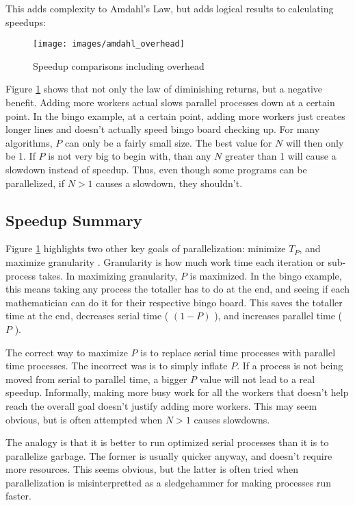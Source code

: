 This adds complexity to Amdahl's Law, but adds logical results to calculating speedups:

\begin{figure}[h]
	\begin{center}
		\texttt{[image: images/amdahl\_overhead]}
		\caption{Speedup comparisons including overhead} 
		\label{amdahl_overhead_graph}
	\end{center}
\end{figure}

Figure \ref{amdahl_overhead_graph} shows that not only the law of diminishing returns, but a negative 
benefit. Adding more workers actual slows parallel processes down at a certain point. In the bingo example,
at a certain point, adding more workers just creates longer lines and doesn't actually speed bingo board 
checking up. For many algorithms, $ P $ can only be a fairly small size. The best value for $ N $ will then only be 1. If $ P $ is not very big to begin with, than any $ N $ greater than 1 will cause a slowdown instead 
of speedup. Thus, even though some programs can be parallelized, if $ N > 1 $ causes a slowdown, they 
shouldn't.


\subsection{Speedup Summary}
Figure \ref{amdahl_overhead_graph} highlights two other key goals of parallelization: minimize $ T_P $, and 
maximize \gls{granularity} \cite{mit}. Granularity is how much work time each iteration or sub-process takes. 
In maximizing \gls{granularity}, $ P $ is maximized. In the bingo example, this means taking any process the 
totaller has to do at the end, and seeing if each mathematician can do it for their respective bingo board. This
saves the totaller time at the end, decreases serial time ( $ (1 - P) $ ), and increases parallel time ( $ P $ ).

The correct way to maximize $ P $ is to replace serial time processes with parallel time processes. The 
incorrect was is to simply inflate $ P $. If a process is not being moved from serial to parallel time, a bigger
$ P $ value will not lead to a real speedup. Informally, making more busy work for all the workers that doesn't
help reach the overall goal doesn't justify adding more workers. This may seem obvious, but is often 
attempted when $ N > 1 $ causes slowdowns. 

The analogy is that it is better to run optimized serial processes than it is to parallelize garbage. The former is
usually quicker anyway, and doesn't require more resources. This seems obvious, but the latter is often 
tried when parallelization is misinterpretted as a sledgehammer for making processes run faster.
